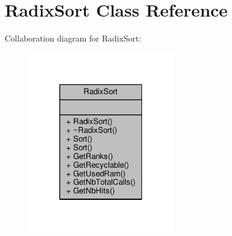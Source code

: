 \hypertarget{classRadixSort}{}\section{Radix\+Sort Class Reference}
\label{classRadixSort}


Collaboration diagram for Radix\+Sort\+:
\nopagebreak
\begin{figure}[H]
\begin{center}
\leavevmode
\includegraphics[width=184pt]{d8/de3/classRadixSort__coll__graph}
\end{center}
\end{figure}
